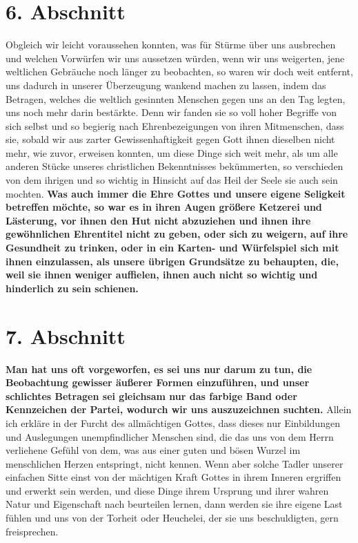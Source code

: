 \section{6. Abschnitt} \label{kap9_ab6}

Obgleich wir leicht voraussehen konnten, was für Stürme über uns ausbrechen und
welchen Vorwürfen wir uns aussetzen würden, wenn wir uns weigerten, jene
weltlichen Gebräuche noch länger zu beobachten, so waren wir doch weit entfernt,
uns dadurch in unserer Überzeugung wankend machen zu lassen, indem das
Betragen, welches die weltlich gesinnten Menschen gegen uns an den Tag legten,
uns noch mehr darin bestärkte. Denn wir fanden sie so voll hoher Begriffe von
sich selbst und so begierig nach Ehrenbezeigungen von ihren Mitmenschen, dass
sie, sobald wir aus zarter Gewissenhaftigkeit gegen Gott ihnen dieselben nicht
mehr, wie zuvor, erweisen konnten, um diese Dinge sich weit mehr, als um alle
anderen Stücke unseres christlichen Bekenntnisses bekümmerten, so verschieden
von
dem ihrigen und so wichtig in Hinsicht auf das Heil der Seele sie auch sein
mochten. \label{ref:09_06_grundsaetze}
\textbf{Was auch immer die Ehre Gottes und unsere eigene Seligkeit
betreffen möchte, so war es in ihren Augen größere
Ketzerei und Lästerung,
vor ihnen den
Hut nicht abzuziehen und ihnen ihre gewöhnlichen Ehrentitel nicht zu geben, oder
sich zu weigern, auf ihre Gesundheit zu trinken, oder in
ein Karten- und
Würfelspiel sich mit ihnen einzulassen, als
unsere übrigen Grundsätze zu
behaupten, die, weil sie ihnen weniger auffielen, ihnen auch nicht so wichtig
und hinderlich zu sein schienen.}

\section{7. Abschnitt} \label{kap9_ab7}

\label{ref:09_07_vorwurff} \textbf{Man hat uns oft vorgeworfen, es sei
uns nur darum zu tun, die Beobachtung
gewisser äußerer Formen einzuführen, und unser schlichtes Betragen sei gleichsam
nur das farbige Band oder Kennzeichen der Partei, wodurch wir uns auszuzeichnen
suchten.} Allein ich erkläre in der Furcht des allmächtigen Gottes, dass dieses
nur Einbildungen und Auslegungen unempfindlicher Menschen sind, die das uns von
dem Herrn verliehene Gefühl von dem, was aus einer guten und bösen Wurzel im
menschlichen Herzen entspringt, nicht kennen. Wenn aber solche Tadler unserer
einfachen Sitte einst von der mächtigen Kraft Gottes in ihrem Inneren ergriffen
und erwerkt sein werden, und diese Dinge ihrem Ursprung und ihrer wahren Natur
und Eigenschaft nach beurteilen lernen, dann werden sie ihre eigene Last fühlen
und uns von der Torheit oder Heuchelei, der sie uns
beschuldigten, gern freisprechen.

